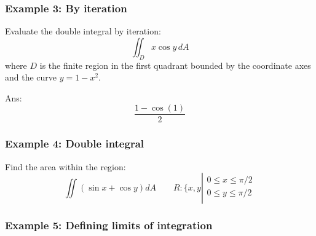 \subsubsection{Example 3: By iteration}
Evaluate the double integral by iteration:
$$\iint_{D}x\cos y\,d A$$
where $D$ is the finite region in the first quadrant bounded by the coordinate axes and the curve
$y=1-x^2$.

Ans: $$\frac{1-\cos(1)}{2}$$
\subsubsection{Example 4: Double integral}
Find the area within the region:
$$\iint(\sin x+\cos y)d A\qquad R: \bigg\{ x,y \left| \begin{array}{c}
 0\leq x\leq \pi/2 \\
 0\leq y\leq \pi/2 \\
\end{array} \right.$$
\subsubsection{Example 5: Defining limits of integration}
